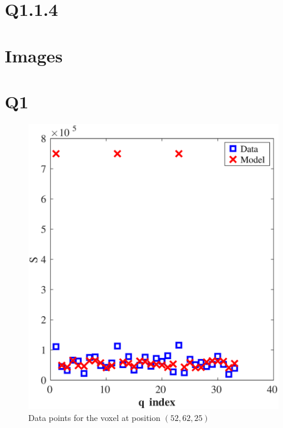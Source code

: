 \documentclass[11pt,a4paper,oneside]{report}
\begin{document}
\section*{Q1.1.4}



\section*{Images}

\section*{Q1}

\begin{figure}[H]
\centering
\includegraphics[scale=0.5]{figures/q1/q111.eps}
\caption{Data points for the voxel at position $(52,62,25)$}
\label{q111}
\end{figure}
\end{document}
